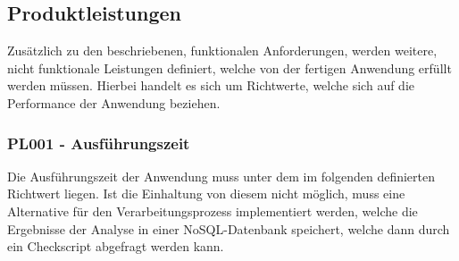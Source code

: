 
\newpage
\subsection{Produktleistungen}\label{subsec:Produktleistungen}
Zusätzlich zu den beschriebenen, funktionalen Anforderungen, werden weitere, nicht funktionale Leistungen definiert, welche von der fertigen Anwendung erfüllt werden müssen. Hierbei handelt es sich um Richtwerte, welche sich auf die Performance der Anwendung beziehen.

\subsubsection{PL001 - Ausführungszeit}\label{subsubsec:PL001}
Die Ausführungszeit der Anwendung muss unter dem im folgenden definierten Richtwert liegen. Ist die Einhaltung von diesem nicht möglich, muss eine Alternative für den Verarbeitungsprozess implementiert werden, welche die Ergebnisse der Analyse in einer NoSQL-Datenbank speichert, welche dann durch ein Checkscript abgefragt werden kann.

